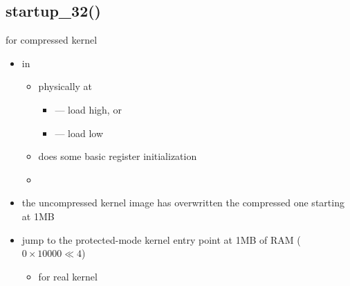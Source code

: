 \subsection{startup\_32()}

\begin{frame}{}%
  \begin{block}{ for compressed kernel}
    \begin{itemize}
    \item in 
      \begin{itemize}
      \item physically at
        \begin{itemize}
        \item[] --- load high, or
        \item[] --- load low
        \end{itemize}
      \item does some basic register initialization
      \item {}
      \end{itemize}
    \item the uncompressed kernel image has overwritten the compressed one starting at 1MB
    \item jump to the protected-mode kernel entry point at 1MB of RAM ($0×10000\ll 4$)
      \begin{itemize}
      \item {} for real kernel
      \end{itemize}
    \end{itemize}
  \end{block}
\end{frame}

